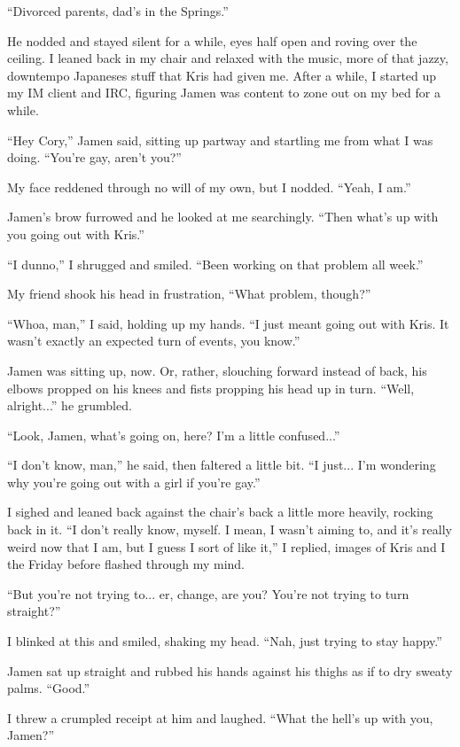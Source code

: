 ``Divorced parents, dad's in the Springs.''

He nodded and stayed silent for a while, eyes half open and roving over the ceiling.  I leaned back in my chair and relaxed with the music, more of that jazzy, downtempo Japaneses stuff that Kris had given me.  After a while, I started up my IM client and IRC, figuring Jamen was content to zone out on my bed for a while.

``Hey Cory,'' Jamen said, sitting up partway and startling me from what I was doing.  ``You're gay, aren't you?''

My face reddened through no will of my own, but I nodded.  ``Yeah, I am.''

Jamen's brow furrowed and he looked at me searchingly.  ``Then what's up with you going out with Kris.''

``I dunno,'' I shrugged and smiled.  ``Been working on that problem all week.''

My friend shook his head in frustration, ``What problem, though?''

``Whoa, man,'' I said, holding up my hands.  ``I just meant going out with Kris.  It wasn't exactly an expected turn of events, you know.''

Jamen was sitting up, now.  Or, rather, slouching forward instead of back, his elbows propped on his knees and fists propping his head up in turn.  ``Well, alright...'' he grumbled.

``Look, Jamen, what's going on, here?  I'm a little confused...''

``I don't know, man,'' he said, then faltered a little bit.  ``I just... I'm wondering why you're going out with a girl if you're gay.''

I sighed and leaned back against the chair's back a little more heavily, rocking back in it.  ``I don't really know, myself.  I mean, I wasn't aiming to, and it's really weird now that I am, but I guess I sort of like it,'' I replied, images of Kris and I the Friday before flashed through my mind.

``But you're not trying to... er, change, are you?  You're not trying to turn straight?''

I blinked at this and smiled, shaking my head.  ``Nah, just trying to stay happy.''

Jamen sat up straight and rubbed his hands against his thighs as if to dry sweaty palms.  ``Good.''

I threw a crumpled receipt at him and laughed.  ``What the hell's up with you, Jamen?''

